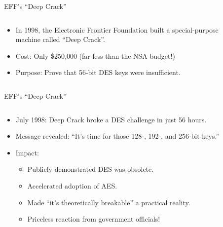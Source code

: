\documentclass[aspectratio=169, lualatex, handout]{beamer}
\begin{document}
\begin{frame}{EFF's ``Deep Crack''}
	\begin{columns}[c]
		\begin{column}{0.6\textwidth}
			\begin{itemize}
				\item In 1998, the Electronic Frontier Foundation built a special-purpose machine called ``Deep Crack''.
				\item Cost: Only \$250,000 (far less than the NSA budget!)
				\item Purpose: Prove that 56-bit DES keys were insufficient.
			\end{itemize}
		\end{column}
		\begin{column}{0.4\textwidth}
		\end{column}
	\end{columns}
\end{frame}

\begin{frame}{EFF's ``Deep Crack''}
	\begin{columns}[c]
		\begin{column}{0.6\textwidth}
			\begin{itemize}
				\item July 1998: Deep Crack broke a DES challenge in just 56 hours.
				\item Message revealed: ``It's time for those 128-, 192-, and 256-bit keys.''
				\item Impact:
				      \begin{itemize}
					      \item Publicly demonstrated DES was obsolete.
					      \item Accelerated adoption of AES.
					      \item Made ``it's theoretically breakable'' a practical reality.
					      \item Priceless reaction from government officials!
				      \end{itemize}
			\end{itemize}
		\end{column}
		\begin{column}{0.4\textwidth}
		\end{column}
	\end{columns}
\end{frame}
\end{document}
